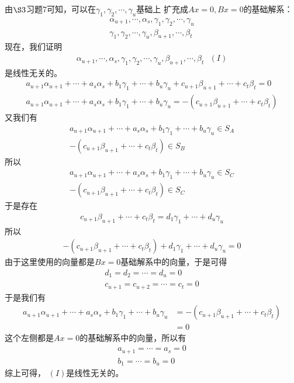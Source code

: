 \documentclass{article}
\begin{document}
由$\S 3$习题7可知，可以在$\gamma_1,\gamma_2,\cdots,\gamma_u$基础上
扩充成$Ax = 0, Bx = 0$的基础解系：
\begin{align*}
  \alpha_{u + 1}, \cdots, \alpha_s, \gamma_1, \gamma_2, \cdots, \gamma_u \\
  \gamma_1, \gamma_2, \cdots, \gamma_u, \beta_{u + 1}, \cdots, \beta_t
\end{align*}
现在，我们证明
\begin{align*}
  \alpha_{u + 1}, \cdots, \alpha_s, \gamma_1, \gamma_2, \cdots, \gamma_u, \beta_{u + 1}, \cdots, \beta_t
  \ \ \ (I)
\end{align*}
是线性无关的。
\begin{align*}
  a_{u + 1}\alpha_{u + 1} + \cdots + a_s \alpha_s
  + b_1 \gamma_1 + \cdots + b_u \gamma_u + c_{u + 1}\beta_{u + 1} + \cdots + c_t\beta_t = 0 \\
  a_{u + 1}\alpha_{u + 1} + \cdots + a_s \alpha_s + b_1 \gamma_1 + \cdots + b_u \gamma_u
  = - (c_{u + 1}\beta_{u + 1} + \cdots + c_t\beta_t)
\end{align*}
又我们有
\begin{align*}
  a_{u + 1}\alpha_{u + 1} + \cdots + a_s \alpha_s + b_1 \gamma_1 + \cdots + b_u \gamma_u \in S_A \\
  - (c_{u + 1}\beta_{u + 1} + \cdots + c_t\beta_t) \in S_B
\end{align*}
所以
\begin{align*}
  a_{u + 1}\alpha_{u + 1} + \cdots + a_s \alpha_s + b_1 \gamma_1 + \cdots + b_u \gamma_u \in S_C \\
  - (c_{u + 1}\beta_{u + 1} + \cdots + c_t\beta_t) \in S_C
\end{align*}
于是存在
\begin{align*}
  c_{u + 1}\beta_{u + 1} + \cdots + c_t\beta_t = d_1 \gamma_1 + \cdots + d_u \gamma_u
\end{align*}
所以
\begin{align*}
  - (c_{u + 1}\beta_{u + 1} + \cdots + c_t\beta_t) + d_1 \gamma_1 + \cdots + d_u \gamma_u = 0
\end{align*}
由于这里使用的向量都是$Bx = 0$基础解系中的向量，于是可得
\begin{align*}
  d_1 = d_2 = \cdots = d_u = 0 \\
  c_{u + 1} = c_{u + 2} = \cdots = c_t = 0
\end{align*}
于是我们有
\begin{align*}
  a_{u + 1}\alpha_{u + 1} + \cdots + a_s \alpha_s + b_1 \gamma_1 + \cdots + b_u \gamma_u
   & = - (c_{u + 1}\beta_{u + 1} + \cdots + c_t\beta_t) \\
   & = 0
\end{align*}
这个左侧都是$Ax = 0$的基础解系中的向量，所以有
\begin{align*}
  a_{u + 1} = \cdots = a_s = 0 \\
  b_1 = \cdots = b_u = 0
\end{align*}
综上可得，
$(I)$是线性无关的。
\end{document}
